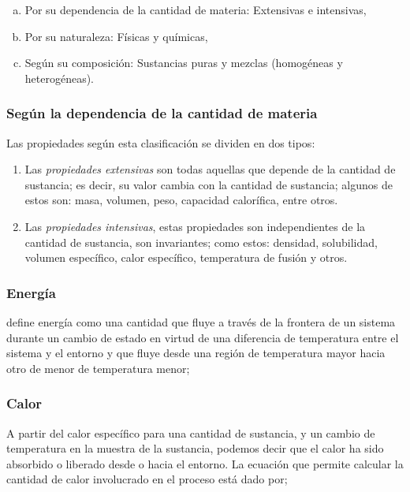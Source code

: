   \begin{enumerate}[a)] %
    \item Por su dependencia de la cantidad de materia: Extensivas e intensivas,
    \item Por su naturaleza: Físicas y químicas,
    \item Según su composición: Sustancias puras y mezclas (homogéneas y heterogéneas).
  \end{enumerate}

  \subsubsection{Según la dependencia de la cantidad de materia}
    Las propiedades según esta clasificación se dividen en dos tipos:
    \begin{enumerate}
      \item Las \textit{propiedades extensivas} son todas aquellas que depende de la cantidad de sustancia; es decir, su valor cambia con la cantidad de sustancia; algunos de estos son: masa, volumen, peso, capacidad calorífica, entre otros.
      \item Las \textit{propiedades intensivas}, estas propiedades son independientes de la cantidad de sustancia, son invariantes; como estos: densidad, solubilidad, volumen específico, calor específico, temperatura de fusión y otros.
    \end{enumerate}


      \subsubsection{Energía}
        \parencite{bib:castellan1998fisicoquimica} define energía como una cantidad que fluye a través de la frontera de un sistema durante un cambio de estado en virtud de una diferencia de temperatura entre el sistema y el entorno y que fluye desde una región de temperatura mayor hacia otro de menor de temperatura menor;

      
      \subsubsection{Calor}
        A partir del calor específico para una cantidad de sustancia, y un cambio de temperatura en la muestra de la sustancia, podemos decir que el calor ha sido absorbido o liberado desde o hacia el entorno. La ecuación que permite calcular la cantidad de calor involucrado en el proceso está dado por;

